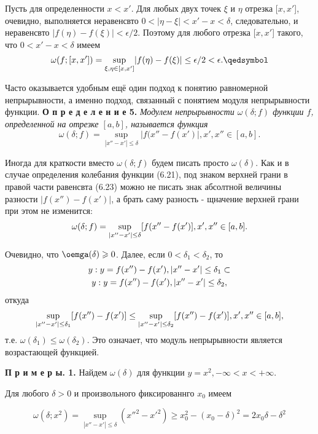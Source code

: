 \documentclass{article}
\begin{document}
\par Пусть для определенности $x < x'$. Для любых двух точек $\xi$ и $\eta$ отрезка [$x,x'$], очевидно, выполняется неравенсвто $0<|\eta - \xi| < x' - x < \delta$, следовательно, и неравенсвто $|f(\eta) - f(\xi)| < \epsilon / 2$. Поэтому для любого отрезка [$x,x'$] такого, что $0 < x' - x < \delta$ имеем
\begin{equation} \notag
    \omega(f;[x,x']) = \underset{\xi,\eta \in [x, x']} \sup |f(\eta) - f(\xi)| \leq \epsilon/2 < \epsilon. \qedsymbol
\end{equation}
\par Часто оказывается удобным ещё один подход к понятию равномерной непрырывности, а именно подход, связанный с понятием модуля непрырывности функции.
\textsf{\textbf{\small{О п р е д е л е н и е 5.}}} \textit{Модулем непрырывности $\omega(\delta;f)$ функции $f$, определенной на отрезке $[a,b]$, называется функция}
\begin{equation} \tag {6.23}
    \omega(\delta;f) = \underset{|x''-x'| \leq \delta} \sup |f(x''-f(x')|, x', x'' \in [a,b].
\end{equation}
\par Иногда для краткости вместо $\omega(\delta;f)$ будем писать просто $\omega(\delta)$. Как и в случае определения колебания функции (6.21), под знаком верхней грани в правой части равенсвта (6.23) можно не писать знак абсолтной величины разности $|f(x'') - f(x')|$, а брать саму разность - щначение верхней грани при этом не изменится:
\begin{equation} \notag
    \omega(\delta;f) = \underset{|x''-x'| \leq \delta} \sup [f(x''-f(x')], x', x'' \in [a,b].
\end{equation}

\par Очевидно, что $\oemga(\delta) \geqslant 0$. Далее, если $0 < \delta_1 < \delta_2$, то
\begin{multline} \notag
    {y: y = f(x'') - f(x'), |x'' - x'| \leq \delta_1} \subset\\ {y: y = f(x'') - f(x'), |x'' - x'| \leq \delta_2},
\end{multline}
откуда
\begin{equation} \notag
    \underset{|x''-x'|\leq\delta_1}\sup[f(x'') - f(x')] \leq \underset{|x''-x'|\leq\delta_2}\sup [f(x'')-f(x')], x', x'' \in [a,b],
\end{equation}
т.е. $\omega(\delta_1) \leq \omega(\delta_2)$. Это означает, что модуль непрырывности является возрастающей функцией.
\par \textsf{\textbf{\small{П р и м е р ы. 1.}}} Найдем $\omega(\delta)$ для функции $y = x^2, -\infty < x < +\infty$.
\par Для любого $\delta > 0$ и произвольного фиксированнго $x_0$ имеем

\begin{equation} \tag {6.24}
    \omega(\delta;x^2) = \underset{|x'' - x'| \leq \delta} \sup (x''^2 - x'^2) \geqslant x_0^2 - (x_0 - \delta)^2 = 2x_0\delta - \delta^2
\end{equation}
\end{document}
